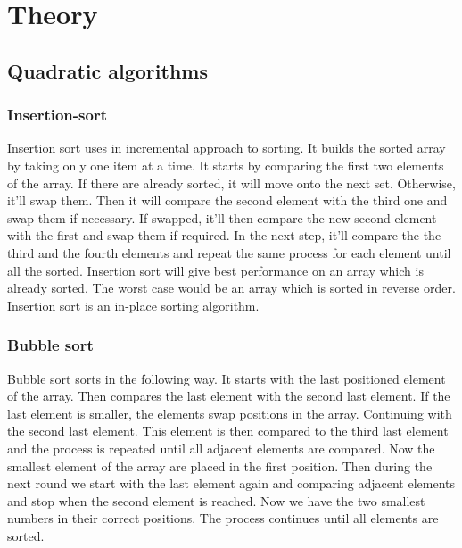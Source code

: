 \documentclass[sigconf, nonacm, natbib, screen, balance=False]{acmart}
\begin{document}
\vspace



\section{Theory}\label{sec:theory}

\subsection{Quadratic algorithms}\label{sec:quadratic-algorithms}

\subsubsection{Insertion-sort}\label{sec:quadratic-algorithms}
Insertion sort uses in incremental approach to sorting. It builds the sorted array by taking only one item at a time. It starts by comparing the first two elements of the array. If there are already sorted, it will move onto the next set. Otherwise, it'll swap them. Then it will compare the second element with the third one and swap them if necessary. If swapped, it'll then compare the new second element with the first and swap them if required. In the next step, it'll compare the the third and the fourth elements and repeat the same process for each element until all the sorted.
Insertion sort will give best performance on an array which is already sorted. The worst case would be an array which is sorted in reverse order.
Insertion sort is an in-place sorting algorithm.
    
\subsubsection{Bubble sort}\label{sec:quadratic-algorithms}
Bubble sort sorts in the following way. It starts with the last positioned element of the array. Then compares the last element with the second last element. If the last element is smaller, the elements swap positions in the array. Continuing with the second last element. This element is then compared to the third last element and the process is repeated until all adjacent elements are compared. Now the smallest element of the array are placed in the first position. Then during the next round we start with the last element again and comparing adjacent elements and stop when the second element is reached. Now we have the two smallest numbers in their correct positions. The process continues until all elements are sorted.
\end{document}
